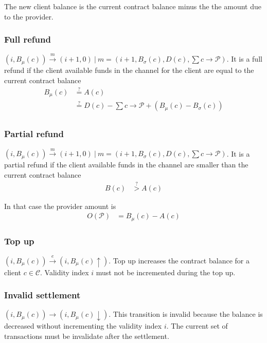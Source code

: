 \documentclass{llncs}
\begin{document}
The new client balance is the current contract balance minus the the amount due to the provider.

\subsubsection{Full refund} $(i, B_\mu(c)) \xrightarrow{m} (i+1, 0)\ |\ m = (i+1, B_\sigma(c), D(c), \sum c \rightarrow \mathcal{P})$. It is a full refund if the client available funds in the channel for the client are equal to the current contract balance
\begin{equation*}
\begin{split}
    B_\mu(c) &\overset{?}{=} A(c) \\
    &\overset{?}{=} D(c) - \textstyle \sum c \rightarrow \mathcal{P} + (B_\mu(c) - B_\sigma(c)) \\
\end{split}
\end{equation*}

\subsubsection{Partial refund} $(i, B_\mu(c)) \xrightarrow{m} (i+1, 0)\ |\ m = (i+1, B_\sigma(c), D(c), \sum c \rightarrow \mathcal{P})$. It is a partial refund if the client available funds in the channel are smaller than the current contract balance
\begin{equation*}
\begin{split}
    B(c) &\overset{?}{>} A(c)
\end{split}
\end{equation*}

In that case the provider amount is
\begin{equation*}
\begin{split}
    O(\mathcal{P}) &= B_\mu(c) - A(c)
\end{split}
\end{equation*}

\subsubsection{Top up} $(i, B_\mu(c)) \xrightarrow{e} (i, B_\mu(c)\uparrow)$. Top up increases the contract balance for a client $c \in \mathcal{C}$. Validity index $i$ must not be incremented during the top up.

\subsubsection{Invalid settlement} $(i, B_\mu(c)) \rightarrow (i, B_\mu(c)\downarrow)$. This transition is invalid because the balance is decreased without incrementing the validity index $i$. The current set of transactions must be invalidate after the settlement.
\end{document}

